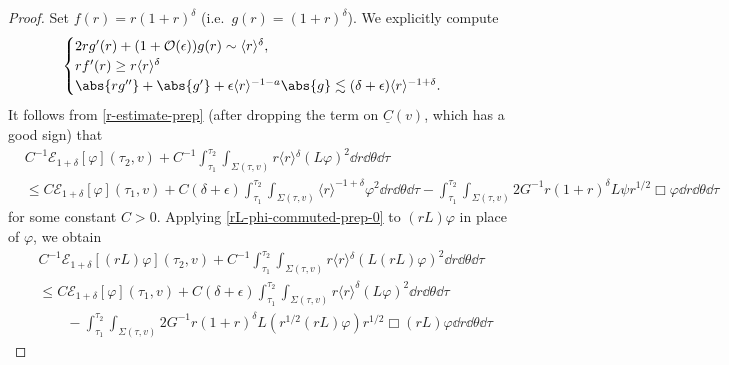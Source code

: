 \documentclass[10pt, reqno]{amsart}
\begin{document}
\begin{proof}
 Set \(f(r)=r(1 + r)^\delta{}\) (i.e.~\(g(r) = (1+r)^\delta{}\)).
We explicitly compute
\begin{equation}
\begin{cases}
2rg'(r) + (1+\mathcal{O}(\epsilon{}))g(r)\sim \langle{}r\rangle^\delta{}, \\
rf'(r)\ge r\langle{}r\rangle^\delta{} \\
\abs{rg''} + \abs{g'} + \epsilon{}\langle{}r\rangle^{-1-a}\abs{g}\lesssim (\delta{} + \epsilon{}) \langle{}r\rangle^{-1+\delta{}}.
\end{cases}
\end{equation}
It follows from \cref{r-estimate-prep} (after dropping the term on
\(\underline{C}(v)\), which has a good sign) that
\begin{equation}\label{rL-phi-commuted-prep-0}
\begin{split}
&C^{-1}\mathcal{E}_{1+\delta{}}[\varphi{}](\tau{}_2,v) + C^{-1}\int_{\tau{}_1}^{\tau{}_2} \int _{\Sigma{}(\tau{},v)} r\langle{}r\rangle{}^\delta{}(L\varphi{})^2\dd{}r\dd{}\theta{}\dd{}\tau{} \\
&\le C\mathcal{E}_{1+\delta{}}[\varphi{}](\tau{}_1,v) +  C(\delta{}+\epsilon{})\int_{\tau{}_1}^{\tau{}_2} \int _{\Sigma{}(\tau{},v)} \langle{}r\rangle^{-1+\delta{}}\varphi^2\dd{}r\dd{}\theta{}\dd{}\tau{} -  \int_{\tau{}_1}^{\tau{}_2} \int _{\Sigma{}(\tau{},v)} 2G^{-1}r(1+r)^\delta{}L\psi{}r^{1/2}\Box{}\varphi{}\dd{}r\dd{}\theta{}\dd{}\tau{}
\end{split}
\end{equation}
for some constant \(C > 0\). Applying \cref{rL-phi-commuted-prep-0} to \((rL)\varphi{}\) in
place of \(\varphi{}\), we obtain
\begin{equation}\label{rL-phi-commuted-prep-1}
\begin{split}
&C^{-1}\mathcal{E}_{1+\delta{}}[(rL)\varphi{}](\tau{}_2,v) + C^{-1}\int_{\tau{}_1}^{\tau{}_2} \int _{\Sigma{}(\tau{},v)} r\langle{}r\rangle{}^\delta{}(L(rL)\varphi{})^2\dd{}r\dd{}\theta{}\dd{}\tau{} \\
&\le C\mathcal{E}_{1+\delta{}}[\varphi{}](\tau{}_1,v) +  C(\delta{}+\epsilon{})\int_{\tau{}_1}^{\tau{}_2} \int _{\Sigma{}(\tau{},v)} r\langle{}r\rangle^\delta{}(L\varphi{})^2\dd{}r\dd{}\theta{}\dd{}\tau{} \\
&\qquad -  \int_{\tau{}_1}^{\tau{}_2} \int _{\Sigma{}(\tau{},v)} 2G^{-1}r(1+r)^\delta{}L(r^{1/2}(rL)\varphi{})r^{1/2}\Box{}(rL)\varphi{}\dd{}r\dd{}\theta{}\dd{}\tau{}
\end{split}
\end{equation}


\end{proof}
\end{document}
